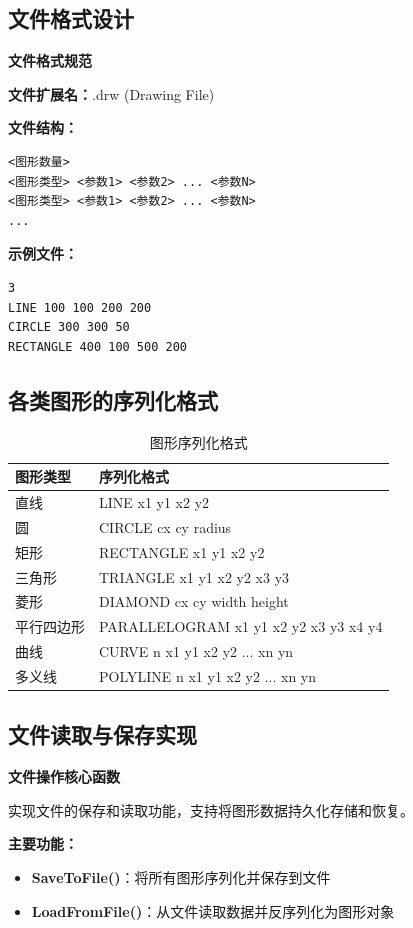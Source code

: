 \documentclass[12pt,a4paper]{article}
\begin{document}
\subsection{文件格式设计}

\begin{tcolorbox}
\textbf{文件格式规范}

\textbf{文件扩展名：}.drw (Drawing File)

\textbf{文件结构：}
\begin{verbatim}
<图形数量>
<图形类型> <参数1> <参数2> ... <参数N>
<图形类型> <参数1> <参数2> ... <参数N>
...
\end{verbatim}

\textbf{示例文件：}
\begin{verbatim}
3
LINE 100 100 200 200
CIRCLE 300 300 50
RECTANGLE 400 100 500 200
\end{verbatim}
\end{tcolorbox}

\subsection{各类图形的序列化格式}

\begin{table}[H]
\centering
\caption{图形序列化格式}
\begin{tabular}{|l|p{10cm}|}
\hline
\textbf{图形类型} & \textbf{序列化格式} \\
\hline
直线 & LINE x1 y1 x2 y2 \\
\hline
圆 & CIRCLE cx cy radius \\
\hline
矩形 & RECTANGLE x1 y1 x2 y2 \\
\hline
三角形 & TRIANGLE x1 y1 x2 y2 x3 y3 \\
\hline
菱形 & DIAMOND cx cy width height \\
\hline
平行四边形 & PARALLELOGRAM x1 y1 x2 y2 x3 y3 x4 y4 \\
\hline
曲线 & CURVE n x1 y1 x2 y2 ... xn yn \\
\hline
多义线 & POLYLINE n x1 y1 x2 y2 ... xn yn \\
\hline
\end{tabular}
\end{table}

\subsection{文件读取与保存实现}

\begin{tcolorbox}
\textbf{文件操作核心函数}

实现文件的保存和读取功能，支持将图形数据持久化存储和恢复。

\textbf{主要功能：}
\begin{itemize}
    \item \textbf{SaveToFile()}：将所有图形序列化并保存到文件
    \item \textbf{LoadFromFile()}：从文件读取数据并反序列化为图形对象
\end{itemize}
\end{tcolorbox}
\end{document}
